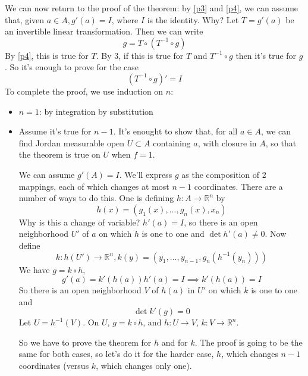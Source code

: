 \documentclass{article}
\newcommand{\reals}[0]{\mathbb{R}}
\begin{document}
We can now return to the proof of the theorem: by \ref{p3} and \ref{p4}, we can assume that, given \(a \in A, g'(a) = I\), where \(I\) is the identity. Why? Let \(T = g'(a)\) be an invertible linear transformation. Then we can write
\begin{equation}
  g = T \circ (T^{-1} \circ g)
\end{equation}
By \ref{p4}, this is true for \(T\). By 3, if this is true for \(T\) and \(T^{-1} \circ g\) then it's true for \(g\). So it's enough to prove for the case
\begin{equation}
    (T^{-1} \circ g)' = I
\end{equation}
To complete the proof, we use induction on \(n\):
\begin{itemize}

  \item \(n = 1\): by integration by substitution

  \item Assume it's true for \(n - 1\). It's enought to show that, for all \(a \in A\), we can find Jordan measurable open \(U \subset A\) containing \(a\), with closure in \(A\), so that the theorem is true on \(U\) when \(f = 1\).

  We can assume \(g'(A) = I\). We'll express \(g\) as the composition of 2 mappings, each of which changes at most \(n - 1\) coordinates. There are a number of ways to do this. One is defining \(h : A \to \reals^n\) by
  \begin{equation}
    h(x) = (g_1(x),...,g_n(x), x_n)
  \end{equation}
  Why is this a change of variable? \(h'(a) = I\), so there is an open neighborhood \(U'\) of \(a\) on which \(h\) is one to one and \(\det h'(a) \neq 0\). Now define
  \begin{equation}
    k: h(U') \to \reals^n, k(y) = (y_1,...,y_{n - 1}, g_n(h^{-1}(y_n)))
  \end{equation}
  We have \(g = k \circ h\),
  \begin{equation}
    g'(a) = k'(h(a))h'(a) = I \implies k'(h(a)) = I
  \end{equation}
  So there is an open neighborhood \(V\) of \(h(a)\) in \(U'\) on which \(k\) is one to one and
  \begin{equation}
    \det k'(g) = 0
  \end{equation}
  Let \(U = h^{-1}(V)\). On \(U\), \(g = k \circ h\), and \(h: U \to V\), \(k: V \to \reals^n\).

  So we have to prove the theorem for \(h\) and for \(k\). The proof is going to be the same for both cases, so let's do it for the harder case, \(h\), which changes \(n - 1\) coordinates (versus \(k\), which changes only one).


\end{itemize}
\end{document}
